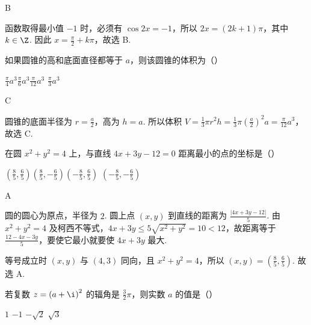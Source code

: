 \begin{answer}
B
\end{answer}

\begin{solution}
函数取得最小值 \(-1\) 时，必须有 \(\cos 2x=-1\)，所以 \(2x=(2k+1)\pi\)，其中 \(k\in\Z\). 因此 \(x=\frac{\pi}{2}+k\pi\)，故选 B.
\end{solution}

\begin{problem}

如果圆锥的高和底面直径都等于 \(a\)，则该圆锥的体积为（\quad）

\choices
{\(\frac{\pi}{4}a^{3} \)}{\(\frac{\pi}{6}a^{3} \)}{\(\frac{\pi}
{12}a^{3} \)}
{\(\frac{\pi}
{3}a^{3} \)}
\end{problem}

\begin{answer}
C
\end{answer}

\begin{solution}
圆锥的底面半径为 \(r=\frac{a}{2}\)，高为 \(h=a\). 所以体积
\(V=\frac{1}{3}\pi r^{2}h=\frac{1}{3}\pi\left(\frac{a}{2}\right)^{2}a=\frac{\pi}{12}a^{3}\)，故选 C.
\end{solution}

\begin{problem}

在圆 \(x^{2} + y^{2} = 4 \) 上，与直线 \(4x + 3y - 12 = 0 \) 距离最小的点的坐标是（\quad）

\choices
{\(\left(\frac{8}{5},\frac{6}{5}\right) \)}{\(\left(\frac{8}{5},-\frac{6}{5}\right) \)}{\(\left(-\frac{8}{5},\frac{6}{5}\right) \)}
{\(\left(-\frac{8}
{5},-\frac{6}
{5}\right) \)}
\end{problem}

\begin{answer}
A
\end{answer}

\begin{solution}
圆的圆心为原点，半径为 \(2\). 圆上点 \((x,y)\) 到直线的距离为
\(\frac{|4x+3y-12|}{5}\). 由 \(x^{2}+y^{2}=4\) 及柯西不等式，\(4x+3y\leqslant5\sqrt{x^{2}+y^{2}}=10<12\)，故距离等于 \(\frac{12-4x-3y}{5}\)，要使它最小就要使 \(4x+3y\) 最大.

等号成立时 \((x,y)\) 与 \((4,3)\) 同向，且 \(x^{2}+y^{2}=4\)，所以 \((x,y)=\left(\frac{8}{5},\frac{6}{5}\right)\). 故选 A.
\end{solution}

\begin{problem}

若复数 \(z = \left(a + \i \right)^2 \) 的辐角是 \(\frac{3}{2} \pi \)，则实数 \(a \) 的值是（\quad）

\choices
{\(1\)}
{\(-1\)}
{\(-\sqrt{2} \)}
{\(\sqrt{3} \)}
\end{problem}

